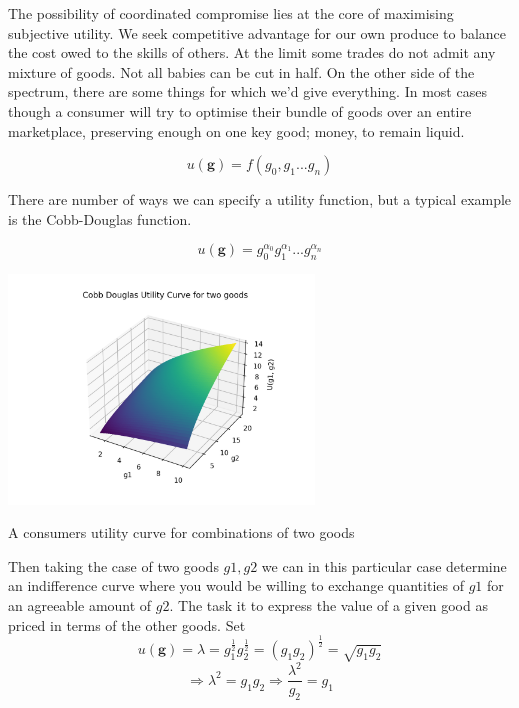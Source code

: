 \documentclass{tufte-handout}
\begin{document}
The possibility of coordinated compromise lies at the core of maximising subjective utility. We seek competitive advantage for our own produce to balance the cost owed to the skills of others. At the limit some trades do not admit any mixture of goods. Not all babies can be cut in half. On the other side of the spectrum, there are some things for which we'd give everything. In most cases though a consumer will try to optimise their bundle of goods over an entire marketplace, preserving enough on one key good; money, to remain liquid. 

$$ u(\mathbf{g}) = f(g_{0}, g_{1} ... g_{n}) $$

There are number of ways we can specify a utility function, but a typical example is the Cobb-Douglas function. 

$$ u(\mathbf{g}) = g_{0}^{\alpha_{0}}g_{1}^{\alpha_{1}} ... g_{n}^{\alpha_{n}}$$

\begin{marginfigure}
\includegraphics[width=3.2in, height=5.in]{Plots/cobb_douglas_utility.png}
\caption{A consumers utility curve for combinations of two goods}
\end{marginfigure} 

Then taking the case of two goods $g1, g2$ we can in this particular case determine an indifference curve where you would be willing to exchange quantities of $g1$ for an agreeable amount of $g2$. The task it to express the value of a given good as priced in terms of the other goods. Set 
$$u(\mathbf{g}) = \lambda =  g_{1}^{\frac{1}{2}}g_{2}^{\frac{1}{2}} = (g_{1}g_{2})^{\frac{1}{2}}  = \sqrt{g_{1}g_{2}}$$
$$ \Rightarrow \lambda^{2} = g_{1}g_{2} \Rightarrow \frac{\lambda^{2}}{g_{2}} = g_{1}$$
\end{document}
